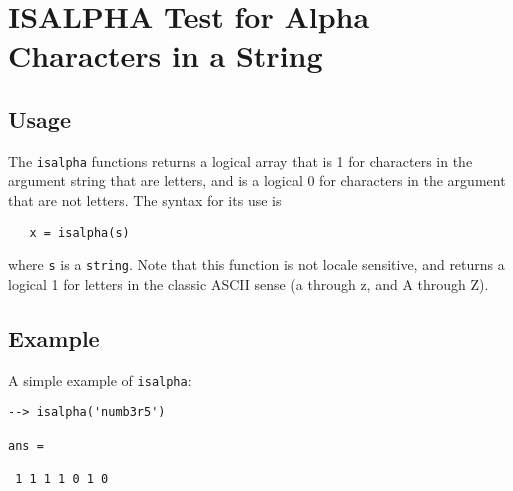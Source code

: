 \section{ISALPHA Test for Alpha Characters in a String}

\subsection{Usage}

The \verb|isalpha| functions returns a logical array that is 1 
for characters in the argument string that are letters, and 
is a logical 0 for characters in the argument that are not
letters.  The syntax for its use is
\begin{verbatim}
   x = isalpha(s)
\end{verbatim}
where \verb|s| is a \verb|string|.  Note that this function is not
locale sensitive, and returns a logical 1 for letters in the
classic ASCII sense (a through z, and A through Z).
\subsection{Example}

A simple example of \verb|isalpha|:
\begin{verbatim}
--> isalpha('numb3r5')

ans = 

 1 1 1 1 0 1 0 
\end{verbatim}
